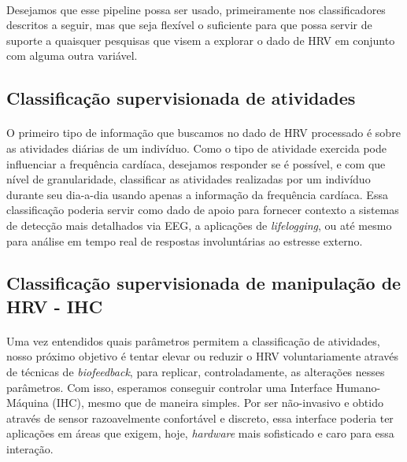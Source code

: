             \paragraph{} Desejamos que esse pipeline possa ser usado, primeiramente nos classificadores descritos a seguir, mas que seja flexível o suficiente para que possa servir de suporte a quaisquer pesquisas que visem a  explorar o dado de HRV em conjunto com alguma outra variável.
        
        \subsection{Classificação supervisionada de atividades}
        
            \paragraph{} O primeiro tipo de informação que buscamos no dado de HRV processado é sobre as atividades diárias de um indivíduo. Como o tipo de atividade exercida pode influenciar a frequência cardíaca, desejamos responder se é possível, e com que nível de granularidade, classificar as atividades realizadas por um indivíduo durante seu dia-a-dia usando apenas a informação da frequência cardíaca. Essa classificação poderia servir como dado de apoio para fornecer contexto a sistemas de detecção mais detalhados via EEG, a aplicações de \textit{lifelogging}, ou até mesmo para análise em tempo real de respostas involuntárias ao estresse externo.
       
        \subsection{Classificação supervisionada de manipulação de HRV - IHC}
            
            \paragraph{} Uma vez entendidos quais parâmetros permitem a classificação de atividades, nosso próximo objetivo é tentar elevar ou reduzir o HRV voluntariamente através de técnicas de \textit{biofeedback}, para replicar, controladamente, as alterações nesses parâmetros. Com isso, esperamos conseguir controlar uma Interface Humano-Máquina (IHC), mesmo que de maneira simples. Por ser não-invasivo e obtido através de sensor razoavelmente confortável e discreto, essa interface poderia ter aplicações em áreas que exigem, hoje, \textit{hardware} mais sofisticado e caro para essa interação.


